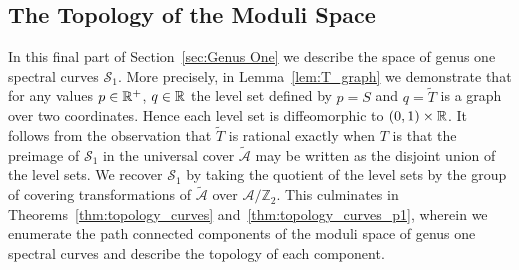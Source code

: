 \documentclass{article}
\begin{document}










\subsection{The Topology of the Moduli Space}\label{sub:Topology}

In this final part of Section~\ref{sec:Genus One} we describe the space of genus one spectral curves $\mathcal{S}_1$. 
More precisely,
in Lemma~\ref{lem:T_graph} we demonstrate that for any values $p \in \mathbb{R}^+$, $q\in\mathbb{R}$ the level set defined by $p = S$ and $q = \tilde{T}$ is a graph over two coordinates. 
Hence each level set is diffeomorphic to $(0,1)\times\mathbb{R}$.
It follows from the observation that $\tilde{T}$ is rational exactly when $T$ is that the preimage of $\mathcal{S}_1$ in the universal cover $\mathcal{\tilde{A}}$ may be written as the disjoint union of the level sets.
We recover $\mathcal{S}_1$ by taking the quotient of the level sets by the group of covering transformations of $\mathcal{\tilde{A}}$ over $\mathcal{A}/\mathbb{Z}_2$. This culminates in Theorems~\ref{thm:topology_curves} and~\ref{thm:topology_curves_p1}, wherein we enumerate the path connected components of the moduli space of genus one spectral curves and describe the topology of each component.
\end{document}
